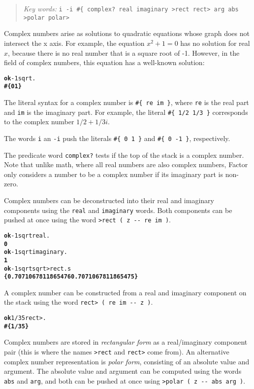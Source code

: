 \documentclass[english]{book}
\newcommand{\chapkeywords}[1]{%
\begin{quote}
\emph{Key words:} \texttt{#1}
\end{quote}
}
\begin{document}
\chapkeywords{i -i \#\{ complex?~real imaginary >rect rect> arg abs >polar polar>}

Complex numbers arise as solutions to quadratic equations whose graph does not intersect the x axis. For example, the equation $x^2 + 1 = 0$ has no solution for real $x$, because there is no real number that is a square root of -1. However, in the field of complex numbers, this equation has a well-known solution:

\begin{alltt}
\textbf{ok} -1 sqrt .
\textbf{\#\{ 0 1 \}}
\end{alltt}

The literal syntax for a complex number is \texttt{\#\{ re im \}}, where \texttt{re} is the real part and \texttt{im} is the imaginary part. For example, the literal \texttt{\#\{ 1/2 1/3 \}} corresponds to the complex number $1/2 + 1/3i$.

The words \texttt{i} an \texttt{-i} push the literals \texttt{\#\{ 0 1 \}} and \texttt{\#\{ 0 -1 \}}, respectively.

The predicate word \texttt{complex?} tests if the top of the stack is a complex number. Note that unlike math, where all real numbers are also complex numbers, Factor only considers a number to be a complex number if its imaginary part is non-zero.

Complex numbers can be deconstructed into their real and imaginary components using the \texttt{real} and \texttt{imaginary} words. Both components can be pushed at once using the word \texttt{>rect ( z -{}- re im )}.

\begin{alltt}
\textbf{ok} -1 sqrt real .
\textbf{0}
\textbf{ok} -1 sqrt imaginary .
\textbf{1}
\textbf{ok} -1 sqrt sqrt >rect .s
\textbf{\{ 0.7071067811865476 0.7071067811865475 \}}
\end{alltt}

A complex number can be constructed from a real and imaginary component on the stack using the word \texttt{rect> ( re im -{}- z )}.

\begin{alltt}
\textbf{ok} 1/3 5 rect> .
\textbf{\#\{ 1/3 5 \}}
\end{alltt}

Complex numbers are stored in \emph{rectangular form} as a real/imaginary component pair (this is where the names \texttt{>rect} and \texttt{rect>} come from). An alternative complex number representation is \emph{polar form}, consisting of an absolute value and argument. The absolute value and argument can be computed using the words \texttt{abs} and \texttt{arg}, and both can be pushed at once using \texttt{>polar ( z -{}- abs arg )}.
\end{document}
